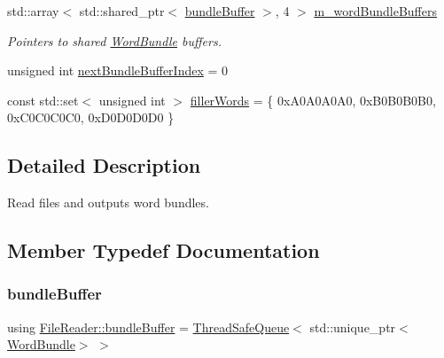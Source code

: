 \begin{DoxyCompactItemize}
std\+::array$<$ std\+::shared\+\_\+ptr$<$ \hyperlink{class_file_reader_ac755c1e271610c2c12a7fc5b55cc048b}{bundle\+Buffer} $>$, 4 $>$ \hyperlink{class_file_reader_a038d1362d7e0458b3450ab8584eab688}{m\+\_\+word\+Bundle\+Buffers}
\begin{DoxyCompactList}\small\item\em Pointers to shared \hyperlink{class_word_bundle}{Word\+Bundle} buffers. \end{DoxyCompactList}\item 
unsigned int \hyperlink{class_file_reader_a44215632cb0ae7ee51991eb3213d03bf}{next\+Bundle\+Buffer\+Index} = 0
\item 
const std\+::set$<$ unsigned int $>$ \hyperlink{class_file_reader_a7a0bb5e7cb117f6a415f005665893509}{filler\+Words} = \{ 0x\+A0\+A0\+A0\+A0, 0x\+B0\+B0\+B0\+B0, 0x\+C0\+C0\+C0\+C0, 0x\+D0\+D0\+D0\+D0 \}
\end{DoxyCompactItemize}


\subsection{Detailed Description}
Read files and outputs word bundles. 

\subsection{Member Typedef Documentation}
\mbox{\label{class_file_reader_ac755c1e271610c2c12a7fc5b55cc048b}} 
\subsubsection{\texorpdfstring{bundle\+Buffer}{bundleBuffer}}
{\footnotesize\ttfamily using \hyperlink{class_file_reader_ac755c1e271610c2c12a7fc5b55cc048b}{File\+Reader\+::bundle\+Buffer} =  \hyperlink{class_thread_safe_queue}{Thread\+Safe\+Queue}$<$ std\+::unique\+\_\+ptr$<$\hyperlink{class_word_bundle}{Word\+Bundle}$>$ $>$\hspace{0.3cm}{\ttfamily [private]}}

\mbox{\label{class_file_reader_a7fb625dc45cee3256d37cc19c65cad86}} 
